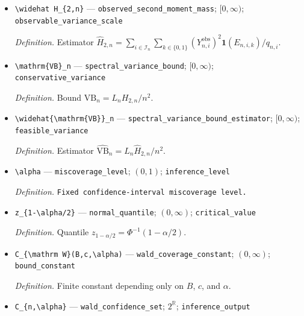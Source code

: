 \documentclass{article}
\begin{document}
\begin{itemize}
  \item \texttt{\textbackslash{}\allowbreak{}widehat H\_\allowbreak{}\{2,\allowbreak{}n\}\allowbreak{}} --- \texttt{observed\_\allowbreak{}second\_\allowbreak{}moment\_\allowbreak{}mass}; \([0,\infty)\); \texttt{observable\_\allowbreak{}variance\_\allowbreak{}scale}
  \par\smallskip\noindent\emph{Definition.} Estimator \(\widehat H_{2,n}=\sum_{i\in\mathcal I_n}\sum_{k\in\{0,1\}}(Y_{n,i}^{\mathrm{obs}})^2\mathbf 1(E_{n,i,k})/q_{n,i}\).
  \item \texttt{\textbackslash{}\allowbreak{}mathrm\{VB\}\allowbreak{}\_\allowbreak{}n} --- \texttt{spectral\_\allowbreak{}variance\_\allowbreak{}bound}; \([0,\infty)\); \texttt{conservative\_\allowbreak{}variance}
  \par\smallskip\noindent\emph{Definition.} Bound \(\mathrm{VB}_n=L_nH_{2,n}/n^2\).
  \item \texttt{\textbackslash{}\allowbreak{}widehat\{\textbackslash{}\allowbreak{}mathrm\{VB\}\allowbreak{}\}\allowbreak{}\_\allowbreak{}n} --- \texttt{spectral\_\allowbreak{}variance\_\allowbreak{}bound\_\allowbreak{}estimator}; \([0,\infty)\); \texttt{feasible\_\allowbreak{}variance}
  \par\smallskip\noindent\emph{Definition.} Estimator \(\widehat{\mathrm{VB}}_n=L_n\widehat H_{2,n}/n^2\).
  \item \texttt{\textbackslash{}\allowbreak{}alpha} --- \texttt{miscoverage\_\allowbreak{}level}; \((0,1)\); \texttt{inference\_\allowbreak{}level}
  \par\smallskip\noindent\emph{Definition.} \texttt{Fixed confidence-\allowbreak{}interval miscoverage level.}
  \item \texttt{z\_\allowbreak{}\{1-\allowbreak{}\textbackslash{}\allowbreak{}alpha/\allowbreak{}2\}\allowbreak{}} --- \texttt{normal\_\allowbreak{}quantile}; \((0,\infty)\); \texttt{critical\_\allowbreak{}value}
  \par\smallskip\noindent\emph{Definition.} Quantile \(z_{1-\alpha/2}=\Phi^{-1}(1-\alpha/2)\).
  \item \texttt{C\_\allowbreak{}\{\textbackslash{}\allowbreak{}mathrm W\}\allowbreak{}(B,\allowbreak{}c,\allowbreak{}\textbackslash{}\allowbreak{}alpha)} --- \texttt{wald\_\allowbreak{}coverage\_\allowbreak{}constant}; \((0,\infty)\); \texttt{bound\_\allowbreak{}constant}
  \par\smallskip\noindent\emph{Definition.} Finite constant depending only on \(B\), \(c\), and \(\alpha\).
  \item \texttt{C\_\allowbreak{}\{n,\allowbreak{}\textbackslash{}\allowbreak{}alpha\}\allowbreak{}} --- \texttt{wald\_\allowbreak{}confidence\_\allowbreak{}set}; \(2^{\mathbb R}\); \texttt{inference\_\allowbreak{}output}

\end{itemize}
\end{document}
